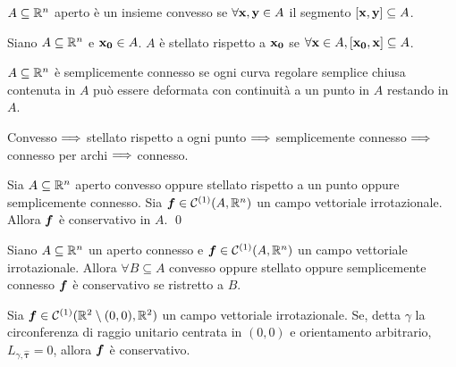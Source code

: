 \begin{definition}
	$A \subseteq \mathbb{R}^n$ aperto è un insieme convesso se $\forall \vb{x},\vb{y} \in A$ il segmento $[\vb{x},\vb{y}] \subseteq A$.
\end{definition}

\begin{definition}
	Siano $A \subseteq \mathbb{R}^n$ e $\vb{x_0} \in A$. $A$ è stellato rispetto a $\vb{x_0}$ se $\forall \vb{x} \in A, [\vb{x_0},\vb{x}]\subseteq A$.
\end{definition}

\begin{definition}
	$A \subseteq \mathbb{R}^n$ è semplicemente connesso se ogni curva regolare semplice chiusa contenuta in $A$ può essere deformata con continuità a un punto in $A$ restando in $A$.
\end{definition}

\begin{remark}
	Convesso $\Longrightarrow$ stellato rispetto a ogni punto $\Longrightarrow$ semplicemente connesso $\Longrightarrow$ connesso per archi $\Longrightarrow$ connesso.
\end{remark}

\begin{lemma}
	[di Poincarè]
	Sia $A \subseteq \mathbb{R}^n$ aperto convesso oppure stellato rispetto a un punto oppure semplicemente connesso. Sia $\bm f\in \mathcal{C}^{(1)}(A,\mathbb{R}^n)$ un campo vettoriale irrotazionale. Allora $\bm f$ è conservativo in $A$.
	\qed
\end{lemma}

\begin{corollary}\label{cor:loc_cons}
	Siano $A \subseteq \mathbb{R}^n$ un aperto connesso e $\bm f \in \mathcal{C}^{(1)}(A,\mathbb{R}^n)$ un campo vettoriale irrotazionale. Allora $\forall B\subseteq A$ convesso oppure stellato oppure semplicemente connesso $\bm f$ è conservativo se ristretto a $B$.
\end{corollary}

\begin{theorem}
	Sia $\bm f \in \mathcal{C}^{(1)}(\mathbb{R}^2\setminus{(0,0)}, \mathbb{R}^2)$ un campo vettoriale irrotazionale. Se, detta $\gamma$ la circonferenza di raggio unitario centrata in $(0,0)$ e orientamento arbitrario, $L_{\gamma, \hat{\bm\tau}}=0$, allora $\bm f$ è conservativo.
\end{theorem}

